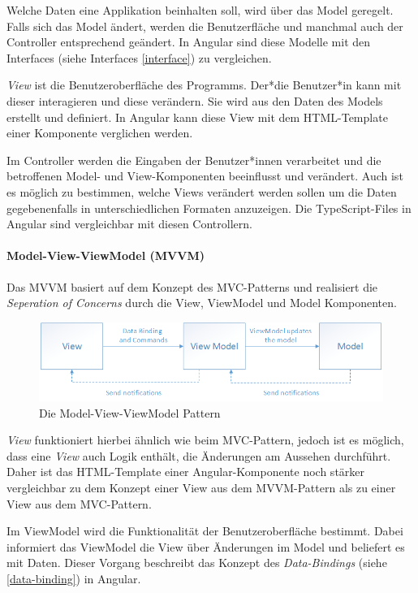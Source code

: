 Welche Daten eine Applikation beinhalten soll, wird über das Model geregelt. Falls sich das Model ändert, werden die Benutzerfläche und manchmal auch der Controller entsprechend geändert. In Angular sind diese Modelle mit den Interfaces (siehe Interfaces \ref{interface})  zu vergleichen.

\emph{View} ist die Benutzeroberfläche des Programms. Der*die Benutzer*in kann mit dieser interagieren und diese verändern. Sie wird aus den Daten des Models erstellt und definiert. In Angular kann diese View mit dem HTML-Template einer Komponente verglichen werden.

Im Controller werden die Eingaben der Benutzer*innen verarbeitet und die betroffenen Model- und View-Komponenten beeinflusst und verändert. Auch ist es möglich zu bestimmen, welche Views verändert werden sollen um die Daten gegebenenfalls in unterschiedlichen Formaten anzuzeigen. Die TypeScript-Files in Angular sind vergleichbar mit diesen Controllern.
\cite{MVC}

\paragraph{Model-View-ViewModel (MVVM)}
Das MVVM basiert auf dem Konzept des MVC-Patterns und realisiert die \emph{Seperation of Concerns} durch die View, ViewModel und Model Komponenten.

\begin{figure} [h t]
  \centering
  \includegraphics[scale=0.5]{pics/mvvm-pattern.png}
  \caption{Die Model-View-ViewModel Pattern \cite{MVVM}}
  \label{fig:tech:front:mvvm-architecture}
\end{figure}

\emph{View} funktioniert hierbei ähnlich wie beim MVC-Pattern, jedoch ist es möglich, dass eine \emph{View} auch Logik enthält, die Änderungen am Aussehen durchführt. Daher ist das HTML-Template einer Angular-Komponente noch stärker vergleichbar zu dem Konzept einer View aus dem MVVM-Pattern als zu einer View aus dem MVC-Pattern. 

Im ViewModel wird die Funktionalität der Benutzeroberfläche bestimmt. Dabei informiert das ViewModel die View über Änderungen im Model und beliefert es mit Daten. Dieser Vorgang beschreibt das Konzept des \emph{Data-Bindings} (siehe \ref{data-binding}) in Angular.  

